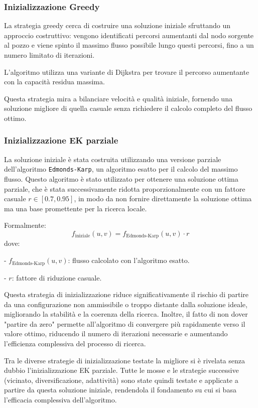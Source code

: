 \documentclass[12pt,a4paper]{article}
\begin{document}
\subsubsection{Inizializzazione Greedy}
La strategia greedy cerca di costruire una soluzione iniziale sfruttando un approccio costruttivo: vengono identificati percorsi aumentanti dal nodo sorgente al pozzo e viene spinto il massimo flusso possibile lungo questi percorsi, fino a un numero limitato di iterazioni.

L’algoritmo utilizza una variante di Dijkstra per trovare il percorso aumentante con la capacità residua massima.

Questa strategia mira a bilanciare velocità e qualità iniziale, fornendo una soluzione migliore di quella casuale senza richiedere il calcolo completo del flusso ottimo.

\subsubsection{Inizializzazione EK parziale}
La soluzione iniziale è stata costruita utilizzando una versione parziale dell'algoritmo \texttt{Edmonds-Karp}, un algoritmo esatto per il calcolo del massimo flusso. Questo algoritmo è stato utilizzato per ottenere una soluzione ottima parziale, che è stata successivamente ridotta proporzionalmente con un fattore casuale $ r \in [0.7, 0.95] $, in modo da non fornire direttamente la soluzione ottima ma una base promettente per la ricerca locale.

Formalmente:
\[
f_{\text{iniziale}}(u,v) = f_{\text{Edmonds-Karp}}(u,v) \cdot r
\]
dove:

    
- $ f_{\text{Edmonds-Karp}}(u,v) $: flusso calcolato con l'algoritmo esatto.
    
- $ r $: fattore di riduzione casuale.

Questa strategia di inizializzazione riduce significativamente il rischio di partire da una configurazione non ammissibile o troppo distante dalla soluzione ideale, migliorando la stabilità e la coerenza della ricerca. Inoltre, il fatto di non dover "partire da zero" permette all’algoritmo di convergere più rapidamente verso il valore ottimo, riducendo il numero di iterazioni necessarie e aumentando l’efficienza complessiva del processo di ricerca.

Tra le diverse strategie di inizializzazione testate la migliore si è rivelata senza dubbio l’inizializzazione EK parziale. Tutte le mosse e le strategie successive (vicinato, diversificazione, adattività) sono state quindi testate e applicate a partire da questa soluzione iniziale, rendendola il fondamento su cui si basa l’efficacia complessiva dell’algoritmo.
\end{document}
